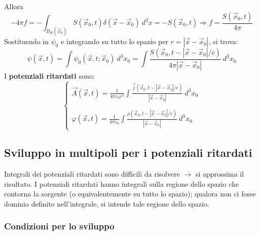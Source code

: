 \documentclass[10pt, a4paper]{scrartcl}
\numberwithin{equation}{subsection}
\theoremstyle{style1}
\begin{document}
Allora
\[
-4 \pi f = - \int_{B_R(\vec{x}_0)} S(\vec{x}_0,t) \delta (\vec{x}-\vec{x}_0) \ d^{3} x = - S(\vec{x}_0,t) \Rightarrow f = \frac{S(\vec{x}_0,t)}{4\pi}
\] 
Sostituendo in $\psi _0$ e integrando su tutto lo spazio per $r=\left\lvert \vec{x}-\vec{x}_0 \right\rvert $, si trova:
\begin{equation}
	\psi (\vec{x},t) = \int \psi _0 (\vec{x},t;\vec{x}_0) \ d^3 x_0 = \int \frac{S(\vec{x}_0, t - \left\lvert \vec{x}-\vec{x}_0 \right\rvert /c)}{4\pi \left\lvert \vec{x}-\vec{x}_0 \right\rvert }\ d^3 x_0
\end{equation}
I \textbf{potenziali ritardati} sono:
\begin{equation}
	\begin{cases}
		\displaystyle \vec{A}(\vec{x},t) = \frac{1}{4\pi \varepsilon _0 c^2}\int \frac{\vec{j}(\vec{x}_0, t - \left\lvert \vec{x}-\vec{x}_0 \right\rvert / c)}{\left\lvert \vec{x}-\vec{x}_0 \right\rvert } \ d^3x_0 \\
		\\
		\displaystyle \varphi (\vec{x},t) = \frac{1}{4\pi \varepsilon _0}\int \frac{\rho (\vec{x}_0,t - \left\lvert \vec{x}-\vec{x}_0 \right\rvert / c)}{\left\lvert \vec{x}-\vec{x}_0 \right\rvert }\ d^3 x_0
	\end{cases}
\end{equation}
\subsection{Sviluppo in multipoli per i potenziali ritardati}

Integrali dei potenziali ritardati sono difficili da risolvere $\to$ si approssima il risultato. I potenziali ritardati hanno integrali sulla regione dello spazio che contorna la sorgente (o equivalentemente su tutto lo spazio); qualora non ci fosse dominio definito nell'integrale, si intende tale regione dello spazio.
\subsubsection{Condizioni per lo sviluppo}
\end{document}

